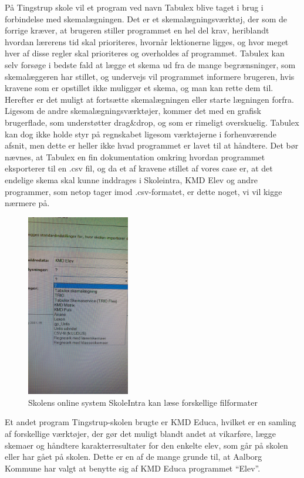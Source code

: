 På Tingstrup skole vil et program ved navn Tabulex blive taget i brug i forbindelse med skemalægningen. Det er et skemalægningsværktøj, der som de forrige kræver, at brugeren stiller programmet en hel del krav, heriblandt hvordan lærerens tid skal prioriteres, hvornår lektionerne ligges, og hvor meget hver af disse regler skal prioriteres og overholdes af programmet\cite{Tabulex}. Tabulex kan selv forsøge i bedste fald at lægge et skema ud fra de mange begrænsninger, som skemalæggeren har stillet, og undervejs vil programmet informere brugeren, hvis kravene som er opstillet ikke muliggør et skema, og man kan rette dem til. Herefter er det  muligt at fortsætte skemalægningen eller starte lægningen forfra. Ligesom de andre skemalægningsværktøjer, kommer det med en grafisk brugerflade, som understøtter drag\&drop, og som er rimeligt overskuelig. Tabulex kan dog ikke holde styr på regnskabet ligesom værktøjerne i forhenværende afsnit, men dette er heller ikke hvad programmet er lavet til at håndtere. Det bør nævnes, at Tabulex en fin dokumentation omkring hvordan programmet eksporterer til en .csv fil\cite{Tabulex_csv}, og da et af kravene stillet af vores case er, at det endelige skema skal kunne inddrages i Skoleintra, KMD Elev og andre programmer,\cite{interview_Kaerby} som netop tager imod .csv-formatet, er dette noget, vi vil kigge nærmere på.
\begin{figure}[h!]
	\centering
	\includegraphics[width=0.4\textwidth]{../Billeder/Skemaimportering_filtyper_Intra.jpg}
	\caption{Skolens online system SkoleIntra kan læse forskellige filformater}
	\label{fig:kompatibleFiltyper}
\end{figure}
\FloatBarrier
Et andet program Tingstrup-skolen brugte er KMD Educa, hvilket er en samling af forskellige værktøjer\cite{KMD}, der gør det muligt blandt andet at vikarføre, lægge skemaer og håndtere karakterresultater for den enkelte elev, som går på skolen eller har gået på skolen. Dette er en af de mange grunde til, at Aalborg Kommune har valgt at benytte sig af KMD Educa programmet ``Elev''\cite{useCase_KMD_Educa_Elev}.

